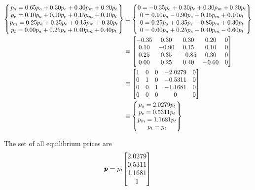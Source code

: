 \documentclass{../mathhomework}
\newenvironment{Mat}{\begin{bmatrix}}{\end{bmatrix}}
\begin{document}
\begin{problem}[1.6\#4]
    \begin{solution}[Part B:]
        \begin{align*}
            \begin{Bmatrix}
                p_a = 0.65p_a + 0.30p_e + 0.30p_m + 0.20p_t \\
                p_e = 0.10p_a + 0.10p_e + 0.15p_m + 0.10p_t \\
                p_m = 0.25p_a + 0.35p_e + 0.15p_m + 0.30p_t \\
                p_t = 0.00p_a + 0.25p_e + 0.40p_m + 0.40p_t
            \end{Bmatrix} & \equiv
            \begin{Bmatrix}
                0 = -0.35p_a + 0.30p_e + 0.30p_m + 0.20p_t \\
                0 = 0.10p_a - 0.90p_e + 0.15p_m + 0.10p_t \\
                0 = 0.25p_a + 0.35p_e - 0.85p_m + 0.30p_t \\
                0 = 0.00p_a + 0.25p_e + 0.40p_m - 0.60p_t
            \end{Bmatrix} \\ & \equiv
            \begin{Mat}
                -0.35 & 0.30 & 0.30 & 0.20 & 0 \\
                0.10 & -0.90 & 0.15 & 0.10 & 0 \\
                0.25 & 0.35 & -0.85 & 0.30 & 0 \\
                0.00 & 0.25 & 0.40 & -0.60 & 0
            \end{Mat} \\ & \equiv
            \begin{Mat}
                1 & 0 & 0 & -2.0279 & 0 \\
                0 & 1 & 0 & -0.5311 & 0 \\
                0 & 0 & 1 & -1.1681 & 0 \\
                0 & 0 & 0 & 0 & 0 \\
            \end{Mat} \\ & \equiv
            \begin{Bmatrix}
                p_a = 2.0279p_t \\
                p_e = 0.5311p_t \\
                p_m = 1.1681p_t \\
                p_t = p_t
            \end{Bmatrix}
        \end{align*}

        The set of all equilibrium prices are
        \begin{equation*}
            \Vect{p} = p_t \begin{Mat}
                2.0279 \\ 0.5311 \\ 1.1681 \\ 1
            \end{Mat}
        \end{equation*}
    \end{solution}
\end{problem}
\end{document}
